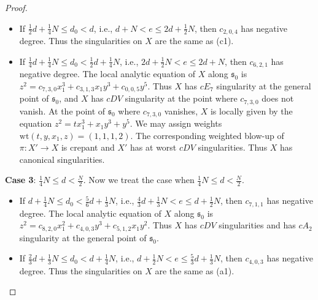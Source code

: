\documentclass[a4paper,11pt]{amsart}
\newcommand{\s}{\ensuremath{\mathfrak{s}}}
\theoremstyle{definition}
\theoremstyle{remark}
\numberwithin{equation}{section}
\begin{document}
\begin{proof}
\begin{itemize}
		\item[(d2)] If $\frac12d + \frac14 N \le d_0 < d $, i.e., $d+N < e \le 2d + \frac{1}{2}N$, then $c_{2,0,4}$ has negative degree. Thus the singularities on $X$ are the same as (c1).
        
		
		\item[(e2)] If $\frac14d+\frac{1}{4}N \le d_0 < \frac12d + \frac14 N$, i.e., $2d + \frac{1}{2}N < e \le 2d + N$, then $c_{6,2,1}$ has negative degree. The local analytic equation of $X$ along $\s_0$ is $z^2=c_{7,3,0}x_1^3 +c_{3,1,3}x_1y^3+c_{0,0,5}y^5$. Thus $X$  has  $cE_7$ singularity at the general point of $\s_0$, and $X$ has $cDV$ singularity at the point where $c_{7,3,0}$ does not vanish. At the point of $\s_0$ where $c_{7,3,0}$ vanishes, $X$ is locally given by the equation $z^2=tx_1^3+x_1y^3+y^5$. We may assign weights $\mathrm{wt}(t,y,x_1,z)=(1,1,1,2)$. The corresponding weighted blow-up of $\pi: X'\to X$ is crepant and $X'$ has at worst $cDV$ singularities. Thus $X$ has canonical singularities.
    \end{itemize}
      
    \textbf{Case 3}: $\frac{1}{4}N\leq d<\frac{N}{2}$. Now we treat the case when $\frac{1}{4}N\leq d<\frac{N}{2}$.
    \begin{itemize}
        \item [(a3)] If $d+\frac{1}{4}N\leq d_0<\frac{5}{6}d+\frac{1}{3}N$, i.e., $\frac{4}{3}d+\frac{1}{3}N<e\leq d+\frac{1}{2}N$, then $c_{7,1,1}$ has negative degree. The local analytic equation of $X$ along $\s_0$ is $z^2 = c_{8,2,0}x_1^2 +c_{4,0,3}y^3+ c_{5,1,2}x_1y^2$. Thus $X$ has $cDV$ singularities and has $cA_2$ singularity at the general point of $\s_0$. 

        \item [(b3)] If $\frac{2}{3}d+\frac{1}{3}N\leq d_0<d+\frac{1}{4}N$, i.e., $d+\frac{1}{2}N<e\leq \frac{5}{3}d+\frac{1}{3}N$, then $c_{4,0,3}$ has negative degree. Thus the singularities on $X$ are the same as (a1).
        


\end{itemize}
\end{proof}
\end{document}
